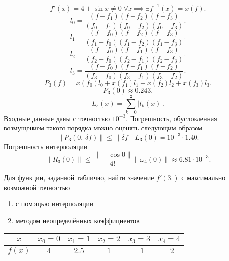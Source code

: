 \documentclass[a4paper]{article}
\begin{document}
\begin{sol}
\[
	f'(x)=4+\sin x \neq 0\; \forall x\implies \exists f^{-1}(x)=
	x(f)
.\] 
\[
	l_0= \frac{(f-f_1)(f-f_2)(f-f_3)}{(f_0-f_1)(f_0-f_2)
	(f_0-f_3)}
.\] 
\[
	l_1=\frac{(f-f_0)(f-f_2)(f-f_3)}{(f_1-f_0)(f_1-f_2)(
	f_1-f_3)}
.\] 
\[
	l_2= \frac{(f-f_0)(f-f_1)(f-f_3)}{(f_2-f_0)(f_2-f_1)
	(f_2-f_3)}
.\] 
\[
	l_3= \frac{(f-f_0)(f-f_1)(f-f_2)}{(f_3-f_0)(f_3-f_1)(f_3-f_2)}
.\] 
\[
	P_3(f)=x(f_0)l_0+x(f_1)l_1+x(f_2)l_2+x(f_3)l_3
.\] 
\[
	P_3(0)\approx 0.243
.\] 
\[
	L_3(x)= \sum_{k=0}^{3} |l_k(x)|
.\] 
Входные данные даны с точностью $10^{-3}$. Погрешность, обусловленная возмущением такого порядка можно оценить следующим образом
\[
	\| P_3(0,\,\delta f)\|\le  \|\delta f \| 
	L_3(0)=10^{-3}\cdot 1.40
.\] 
Погрешность интерполяции
\[
	\| R_3\left( 0 \right) \|\le \frac{\| - \cos 0\|}{4!}
	\| \omega_4 (0)\|\approx 6.81 \cdot 10^{-3}
.\] 
\end{sol}
\begin{hiProb}[9.2c]
	Для функции, заданной таблично, найти значение $f'(3.)$ с максимально возможной точностью
\begin{enumerate}
\item с помощью интерполяции
\item методом неопределённых коэффициентов
\end{enumerate}
\begin{table}[htpb]
	\centering
	\label{tab:3}
	\begin{tabular}{|c|c|c|c|c|c|}
		\hline
	$x$ & $x_0=0$ & $x_1=1$ & $x_2=2$ & $x_3=3$ & $x_4=4$\\
	\hline $f(x)$& $4$& $2.5$ &$1$ & $-1$  &$-2$ \\
	\hline
	\end{tabular}
\end{table}
\end{hiProb}
\end{document}

